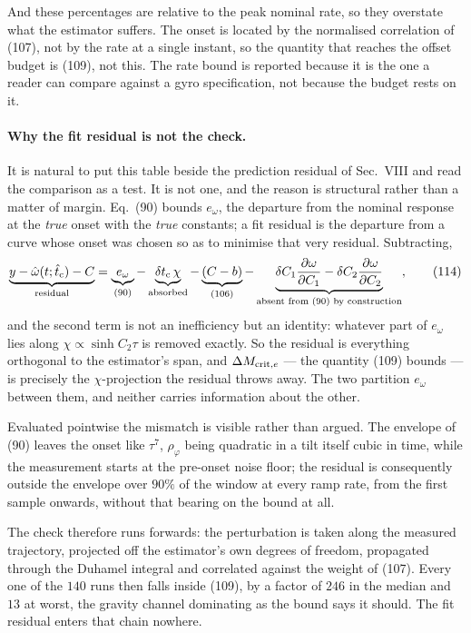 \documentclass[10pt]{article}
\begin{document}
And these percentages are relative to the peak nominal rate, so they
overstate what the estimator suffers. The onset is located by the
normalised correlation of (107), not by the rate at a single instant, so
the quantity that reaches the offset budget is (109), not this. The rate
bound is reported because it is the one a reader can compare against a
gyro specification, not because the budget rests on it.

\paragraph{Why the fit residual is not the check.}
It is natural to put this table beside the prediction residual of
Sec.~VIII and read the comparison as a test. It is not one, and the
reason is structural rather than a matter of margin. Eq.~(90) bounds
$e_\omega$, the departure from the nominal response at the \emph{true}
onset with the \emph{true} constants; a fit residual is the departure
from a curve whose onset was chosen so as to minimise that very
residual. Subtracting,
\begin{equation}
  \underbrace{y - \hat\omega(t;\hat t_{\rm c}) - C}_{\text{residual}}
  = \underbrace{e_\omega}_{\text{(90)}}
  - \underbrace{\delta t_{\rm c}\,\chi}_{\text{absorbed}}
  - \underbrace{(C-b)}_{\text{(106)}}
  - \underbrace{\delta C_1\frac{\partial\omega}{\partial C_1}
              - \delta C_2\frac{\partial\omega}{\partial C_2}}_{
      \text{absent from (90) by construction}} ,
  \tag{114}
\end{equation}
and the second term is not an inefficiency but an identity: whatever
part of $e_\omega$ lies along $\chi\propto\sinh C_2\tau$ is removed
exactly. So the residual is everything orthogonal to the estimator's
span, and $\Delta M_{{\rm crit},e}$ --- the quantity (109) bounds --- is
precisely the $\chi$-projection the residual throws away. The two
partition $e_\omega$ between them, and neither carries information about
the other.

Evaluated pointwise the mismatch is visible rather than argued. The
envelope of (90) leaves the onset like $\tau^{7}$, $\rho_\varphi$ being
quadratic in a tilt itself cubic in time, while the measurement starts
at the pre-onset noise floor; the residual is consequently outside the
envelope over $90\%$ of the window at every ramp rate, from the first
sample onwards, without that bearing on the bound at all.

The check therefore runs forwards: the perturbation is taken along the
measured trajectory, projected off the estimator's own degrees of
freedom, propagated through the Duhamel integral and correlated against
the weight of (107). Every one of the $140$ runs then falls inside
(109), by a factor of $246$ in the median and $13$ at worst, the gravity
channel dominating as the bound says it should. The fit residual enters
that chain nowhere.
\end{document}
